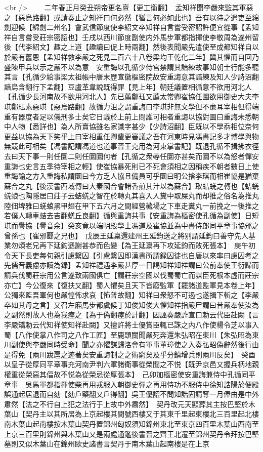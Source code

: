 <br />
　　二年春正月癸丑朔帝更名亶【更工衡翻】　孟知祥聞李嚴來監其軍惡之【惡烏路翻】或請奏止之知祥曰何必然【猶言何必如此也】吾有以待之遣吏至綿劍迎候【綿劍二州名】會武信節度使李紹文卒知祥自言嘗受密詔許便宜從事【孟知祥自言嘗受莊宗密詔也】壬戌以西川節度副使内外馬步軍都指揮使李敬周為遂州留後【代李紹文】趣之上道【趣讀曰促上時兩翻】然後表聞嚴先遣使至成都知祥自以於嚴有舊恩【孟知祥救李嚴之死見二百六十八卷梁均王乾化二年】冀其懼而自回乃盛陳甲兵以示之嚴不以為意　安重誨以孔循少侍宫禁謂其諳練故事知朝士行能多聽其言【孔循少給事梁太祖帳中唐末歷宣徽樞密院故安重誨意其諳練及知人少詩沼翻諳烏含翻行下孟翻】豆盧革韋說既得罪【見上年】朝廷議置相循意不欲用河北人【孔循少長河南故不欲用河北人】先已薦鄭珏又薦太常卿崔協任圜欲用御史大夫李琪鄭珏素惡琪【惡烏路翻】故循力沮之謂重誨曰李琪非無文學但不亷耳宰相但得端重有器度者足以儀刑多士矣它日議於上前上問誰可相者重誨以協對圜曰重誨未悉朝中人物【悉詳也】為人所賣協雖名家識字甚少【少詩沼翻】臣既以不學忝相位奈何更益以協為天下笑乎上曰宰相重任卿輩更審議之吾在河東時見馮書記多才博學與物無競此可相矣【馮書記謂馮道也道事晉王克用為河東掌書記】既退孔循不揖拂衣徑去曰天下事一則任圜二則任圜圜何者【孔循之衆辱任圜亦甚矣而圜不以為怒者憚安重誨也史言五季待宰相之輕】使崔協暴死則已不死會須相之因稱疾不朝者數日上使重誨諭之方入重誨私謂圜曰今方乏人協且備員可乎圜曰明公捨李琪而相崔協是猶棄蘇合之丸【後漢書西域傳曰大秦國合會諸香煎其汁以為蘇合】取蛣蜣之轉也【蛣蜣蜣蜋也陶隱居曰莊子云蛣蜣之智在於轉丸其喜入人糞中取屎丸而却推之俗名為推丸陸佃埤雅曰蜣蜋黑甲翅在甲下五六月之間經營穢場之下車走糞丸一前挽之一後推之若僕人轉車蛣去吉翻蜣丘良翻】循與重誨共事【安重誨為樞密使孔循為副使】日短琪而譽協【譽音余】癸亥竟以端明殿學士馮道及崔協並為中書侍郎同平章事協邠之曾孫也【崔邠郾之兄也】　戊辰王延稟還建州王延鈞送之將别謂延鈞曰善守先人基業勿煩老兄再下延鈞遜謝甚恭而色變【為王延禀再下攻延鈞而敗死張本】　庚午初令天下長吏每旬親引慮繋囚【引慮繫囚即漢書所謂録囚徒也自唐以來率曰慮囚考之先儒音義慮亦讀為録】孟知祥禮遇李嚴甚厚一日謁知祥知祥謂曰公前奉使王衍歸而請兵伐蜀莊宗用公言遂致兩國俱亡【謂莊宗空國以伐蜀蜀亡而謀臣死根本虛而莊宗亦亡】今公復來【復扶又翻】蜀人懼矣且天下皆廢監軍【罷諸道監軍見本卷上年】公獨來監吾軍何也嚴惶怖求哀【怖普故翻】知祥曰衆怒不可遏也遂揖下斬之【李嚴卒如其母之言】又召左廂馬步都虞候丁知俊知俊大懼知祥指嚴尸謂曰昔嚴奉使汝為之副然則故人也為我瘞之【為于偽翻瘞於計翻】因誣奏嚴詐宣口勅云代臣赴闕【言李嚴矯勅云代知祥使知祥赴闕】又擅許將士優賞臣輒已誅之内八作使楊令芝以事入蜀【八作使掌八作司之八作工匠】至鹿頭關聞嚴死奔還朱弘昭在東川【朱弘昭為東川副使與李嚴同時受命】聞之亦懼謀歸洛會有軍事董璋使之入奏弘昭偽辭然後行由是得免【兩川跋扈之迹著矣安重誨制之之術窮矣及乎分鎮增兵則兩川反矣】　癸酉以皇子從厚同平章事充河南尹判六軍諸衛事從榮聞之不悦【既尹京邑又握兵柄地親權重從榮惡其偪故不悦為從榮忌從厚張本】　己卯加樞密使安重誨兼侍中孔循同平章事　吳馬軍都指揮使柴再用戎服入朝御史彈之再用恃功不服侍中徐知誥陽於便殿誤通起居退而自劾【劾戶槩翻又戶得翻】吳王優詔不問知誥固請奪一月俸由是中外肅然【法之不行自上犯之法行于上故中外肅然】　契丹改元天顯葬其主按巴堅於木葉山【契丹主以其所居為上京起樓其間號西樓又于其東千里起東樓北三百里起北樓南木葉山起南樓按木葉山契丹置錦州匈奴須知錦州東北至東京四百里木葉山西南至上京三百里則錦州與木葉山又是兩處通鑑後書晉之齊王北遷至錦州契丹令拜按巴堅墓則又似木葉山在錦州歐史諸書言契丹于南木葉山起南樓是在上京